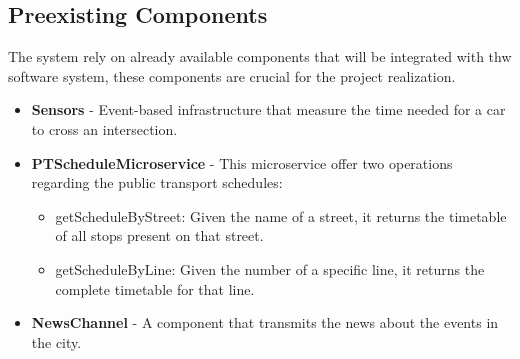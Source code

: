 \documentclass[a4paper,12pt]{article}
\begin{document}
\subsection*{Preexisting Components}
The system rely on already available components that will be integrated with thw software system, these components
are crucial for the project realization.   
\begin{itemize}
    \item \textbf{Sensors} - Event-based infrastructure that measure the time needed for a car to cross an intersection. 
    \item \textbf{PTScheduleMicroservice} - This microservice offer two operations regarding the public transport schedules:   
        \begin{itemize}
            \item getScheduleByStreet: Given the name of a street, it returns the timetable of all
            stops present on that street.
            \item getScheduleByLine: Given the number of a specific line, it returns the complete
            timetable for that line.
        \end{itemize}
    \item \textbf{NewsChannel} - A component that transmits the news about the events in the city. 
\end{itemize}
\end{document}
